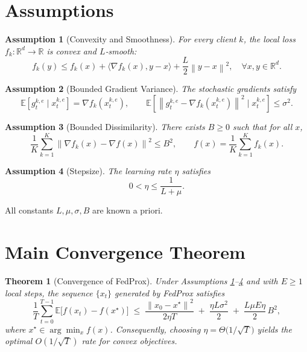 \documentclass{article}
\newtheorem{theorem}{Theorem}
\newtheorem{assumption}{Assumption}
\newcommand{\E}{\mathbb{E}}
\newcommand{\norm}[1]{\left\lVert #1\right\rVert}
\newcommand{\ip}[2]{\langle #1,#2\rangle}
\begin{document}
\section*{Assumptions}
\begin{assumption}[Convexity and Smoothness]\label{ass:convex}
For every client $k$, the local loss $f_k:\mathbb{R}^d\to\mathbb{R}$ is convex and $L$‑smooth:
\[
f_k(y)\le f_k(x)+\ip{\nabla f_k(x)}{y-x}+\frac{L}{2}\norm{y-x}^2,\quad \forall x,y\in\mathbb{R}^d .
\]
\end{assumption}
\begin{assumption}[Bounded Gradient Variance]\label{ass:var}
The stochastic gradients satisfy
\[
\E\!\left[g_{t}^{k,e}\mid x_{t}^{k,e}\right]=\nabla f_k(x_{t}^{k,e}),\qquad
\E\!\left[\norm{g_{t}^{k,e}-\nabla f_k(x_{t}^{k,e})}^2\mid x_{t}^{k,e}\right]\le\sigma^2 .
\]
\end{assumption}
\begin{assumption}[Bounded Dissimilarity]\label{ass:dissim}
There exists $B\ge0$ such that for all $x$,
\[
\frac{1}{K}\sum_{k=1}^{K}\norm{\nabla f_k(x)-\nabla f(x)}^2\le B^2,\qquad 
f(x)=\frac{1}{K}\sum_{k=1}^{K}f_k(x).
\]
\end{assumption}
\begin{assumption}[Stepsize]\label{ass:stepsize}
The learning rate $\eta$ satisfies
\[
0<\eta\le\frac{1}{L+\mu}.
\]
\end{assumption}
All constants $L,\mu,\sigma,B$ are known a priori.

\section*{Main Convergence Theorem}
\begin{theorem}[Convergence of FedProx]\label{thm:main}
Under Assumptions \ref{ass:convex}–\ref{ass:stepsize} and with $E\ge1$ local steps, the sequence $\{x_t\}$ generated by FedProx satisfies
\[
\frac{1}{T}\sum_{t=0}^{T-1}\E\!\bigl[f(x_t)-f(x^\star)\bigr]
\;\le\;
\frac{\norm{x_0-x^\star}^2}{2\eta T}
\;+\;
\frac{\eta L\sigma^2}{2}
\;+\;
\frac{L\mu E\eta}{2} \,B^2 ,
\]
where $x^\star\in\arg\min_{x}f(x)$. Consequently, choosing $\eta = \Theta\!\bigl(1/\sqrt{T}\bigr)$ yields the optimal $O(1/\sqrt{T})$ rate for convex objectives.
\end{theorem}
\end{document}
